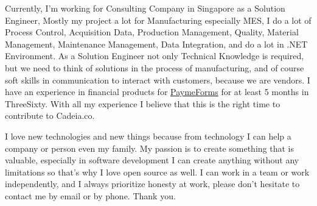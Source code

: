 \documentclass[11pt, a4paper]{awesome-cv}
\begin{document}
\begin{cvletter}
Currently, I'm working for Consulting Company in Singapore as a Solution Engineer, Mostly my project a lot for Manufacturing especially MES, I do a lot of Process Control, Acquisition Data, Production Management, Quality, Material Management, Maintenance Management, Data Integration, and do a lot in .NET Environment. As a Solution Engineer not only Technical Knowledge is required, 
but we need to think of solutions in the process of manufacturing, and of course soft skills in communication to interact with customers, because we are vendors. I have an experience in financial products for \href{https://paymeforms.com/}{PaymeForms}  for at least 5 months in ThreeSixty.
With all my experience I believe that this is the right time to contribute to Cadeia.co.

I love new technologies and new things because from technology I can help a company or person even my family. My passion is to create something that is valuable, especially in software development I can create anything without any limitations so that's why I love open source as well.
I can work in a team or work independently, and I always prioritize honesty at work, please don't hesitate to contact me by email or by phone. Thank you.
\end{cvletter}


\makeletterclosing
\end{document}
